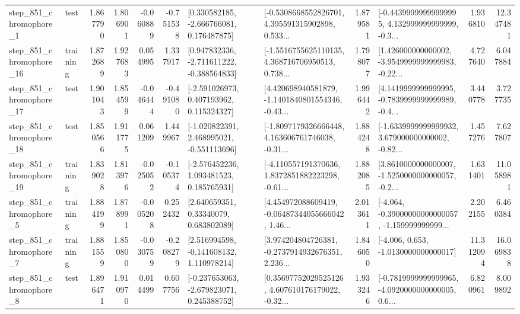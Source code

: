 \begin{tabular}{llrrrrllrlrr}
   step\_851\_chromophore\_1 &      test &      1.867790 &    1.806901 &     -0.060889 & -0.751538 &    [0.330582185, -2.666766081, 0.176487875] &  [-0.5308668552826701, 4.395591315902898, 0.533... &       1.879581 &  [-0.44399999999999995, 4.132999999999999, -0.3... &            1.936810 &         12.347481 \\
  step\_851\_chromophore\_16 &  training &      1.872689 &    1.927683 &      0.054995 &  1.337917 &   [0.947832336, -2.711611222, -0.388564833] &  [-1.5516755625110135, 4.368716706950513, 0.738... &       1.798077 &  [1.426000000000002, -3.9549999999999983, -0.22... &            4.727640 &          6.047884 \\
  step\_851\_chromophore\_17 &      test &      1.901043 &    1.854599 &     -0.046444 & -0.491080 &    [-2.591026973, 0.407193962, 0.115324327] &  [4.420698940581879, -1.1401840801554346, -0.43... &       1.996442 &  [4.1419999999999995, -0.7839999999999989, -0.4... &            3.440778 &          3.727735 \\
  step\_851\_chromophore\_18 &      test &      1.850566 &    1.911775 &      0.061209 &  1.449967 &   [-1.020822391, 2.468995021, -0.551113696] &  [-1.8097179326666448, 4.163606761746038, -0.31... &       1.884248 &  [-1.6339999999999932, 3.679000000000002, -0.82... &            1.457276 &          7.627807 \\
  step\_851\_chromophore\_19 &  training &      1.839028 &    1.813976 &     -0.025052 & -0.105374 &    [-2.576452236, 1.093481523, 0.185765931] &  [-4.110557191370636, 1.8372851882223298, -0.61... &       1.882085 &  [3.8610000000000007, -1.5250000000000057, -0.2... &            1.631401 &         11.058981 \\
   step\_851\_chromophore\_5 &  training &      1.884199 &    1.878991 &     -0.005208 &  0.252432 &      [2.640659351, 0.33340079, 0.683802089] &  [4.454972088609419, -0.06487344055666042, 1.46... &       2.013611 &  [-4.064, -0.39000000000000057, -1.159999999999... &            2.202155 &          6.460384 \\
   step\_851\_chromophore\_7 &  training &      1.881559 &    1.850800 &     -0.030759 & -0.208279 &    [2.516994598, -0.141608132, 1.110978214] &  [3.974204804726381, -0.2737914932676351, 2.236... &       1.846050 &               [-4.006, 0.653, -1.0130000000000017] &           11.312094 &         16.069838 \\
   step\_851\_chromophore\_8 &      test &      1.896471 &    1.910970 &      0.014499 &  0.607756 &   [-0.237653063, -2.679823071, 0.245388752] &  [0.35697752029525126, 4.607610176179022, -0.32... &       1.933246 &  [-0.7819999999999965, -4.0920000000000005, 0.6... &            6.820961 &          8.009892 \\

\end{tabular}
